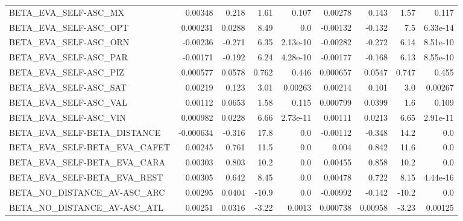 \begin{tabular}{lrrrrrrrr}
BETA\_EVA\_SELF-ASC\_MX                   &     0.00348 &        0.218 &    1.61 &    0.107 &    0.00278 &       0.143 &         1.57 &         0.117 \\
BETA\_EVA\_SELF-ASC\_OPT                  &    0.000231 &       0.0288 &    8.49 &      0.0 &   -0.00132 &      -0.132 &          7.5 &      6.33e-14 \\
BETA\_EVA\_SELF-ASC\_ORN                  &    -0.00236 &       -0.271 &    6.35 & 2.13e-10 &   -0.00282 &      -0.272 &         6.14 &      8.51e-10 \\
BETA\_EVA\_SELF-ASC\_PAR                  &    -0.00171 &       -0.192 &    6.24 & 4.28e-10 &   -0.00177 &      -0.168 &         6.13 &      8.55e-10 \\
BETA\_EVA\_SELF-ASC\_PIZ                  &    0.000577 &       0.0578 &   0.762 &    0.446 &   0.000657 &      0.0547 &        0.747 &         0.455 \\
BETA\_EVA\_SELF-ASC\_SAT                  &     0.00219 &        0.123 &    3.01 &  0.00263 &    0.00214 &       0.101 &          3.0 &       0.00267 \\
BETA\_EVA\_SELF-ASC\_VAL                  &     0.00112 &       0.0653 &    1.58 &    0.115 &   0.000799 &      0.0399 &          1.6 &         0.109 \\
BETA\_EVA\_SELF-ASC\_VIN                  &    0.000982 &       0.0228 &    6.66 & 2.73e-11 &    0.00111 &      0.0213 &         6.65 &      2.91e-11 \\
BETA\_EVA\_SELF-BETA\_DISTANCE            &   -0.000634 &       -0.316 &    17.8 &      0.0 &   -0.00112 &      -0.348 &         14.2 &           0.0 \\
BETA\_EVA\_SELF-BETA\_EVA\_CAFET           &     0.00245 &        0.761 &    11.5 &      0.0 &      0.004 &       0.842 &         11.6 &           0.0 \\
BETA\_EVA\_SELF-BETA\_EVA\_CARA            &     0.00303 &        0.803 &    10.2 &      0.0 &    0.00455 &       0.858 &         10.2 &           0.0 \\
BETA\_EVA\_SELF-BETA\_EVA\_REST            &     0.00305 &        0.642 &    8.45 &      0.0 &    0.00478 &       0.722 &         8.15 &      4.44e-16 \\
BETA\_NO\_DISTANCE\_AV-ASC\_ARC            &     0.00295 &       0.0404 &   -10.9 &      0.0 &   -0.00992 &      -0.142 &        -10.2 &           0.0 \\
BETA\_NO\_DISTANCE\_AV-ASC\_ATL            &     0.00251 &       0.0316 &   -3.22 &   0.0013 &   0.000738 &     0.00958 &        -3.23 &       0.00125 \\

\end{tabular}
